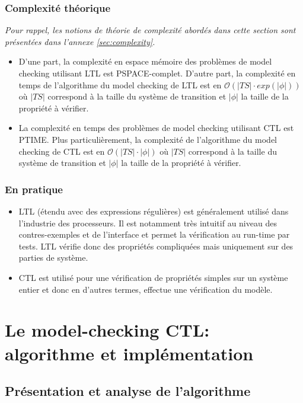 \documentclass[runningheads,a4paper,10pt]{llncs}
\begin{document}
\subsubsection{Complexité théorique \\} 
\danger
\textit{Pour rappel, les notions de théorie de complexité abordés dans cette section sont présentées dans l'annexe \autoref{sec:complexity}.} 

\begin{itemize}
\item D'une part, la complexité en espace mémoire des problèmes de model checking utilisant LTL est PSPACE-complet. D'autre part, la complexité en temps de l'algorithme du model checking de LTL est en $\mathcal{O}(|TS| \cdot exp(|\phi|))$ où $|TS|$ correspond à la taille du système de transition et $|\phi|$ la taille de la propriété à vérifier. 
\item La complexité en temps des problèmes de model checking utilisant CTL est PTIME. Plus particulièrement, la complexité de l'algorithme du model checking de CTL est en $\mathcal{O}(|TS| \cdot |\phi|)$ où $|TS|$ correspond à la taille du système de transition et $|\phi|$ la taille de la propriété à vérifier. 
\end{itemize}


\subsubsection{En pratique}
\begin{itemize}
\item LTL (étendu avec des expressions régulières) est généralement utilisé dans l'industrie des processeurs. Il est notamment très intuitif au niveau des contres-exemples et de l'interface et permet la vérification au run-time par tests. LTL vérifie donc des propriétés compliquées mais uniquement sur des parties de système. 
\item CTL est utilisé pour une vérification de propriétés simples sur un système entier et donc en d'autres termes, effectue une vérification du modèle. 
\end{itemize}


\section{Le model-checking CTL: algorithme et implémentation}
\subsection{Présentation et analyse de l'algorithme}
\end{document}
